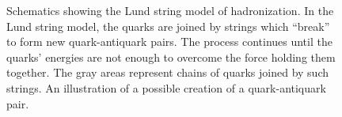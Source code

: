  \begin{figure}[htb]
  \begin{center}
  \end{center}
  \caption[\fixspacing Schematics showing the Lund string model of hadronization]
	  {\fixspacing Schematics showing the Lund string model of hadronization.
	   In the Lund string model, the quarks 
	  are joined by strings which ``break'' to form new 
	  quark-antiquark pairs. 
	  The process continues until the quarks' energies are  
	  not enough to overcome the force holding them together.  
	  The gray areas represent chains of quarks joined by such strings.  
	   An illustration of a possible 
	  creation of a quark-antiquark pair.  
	  }
  \label{fig:MClund}
 \end{figure}





